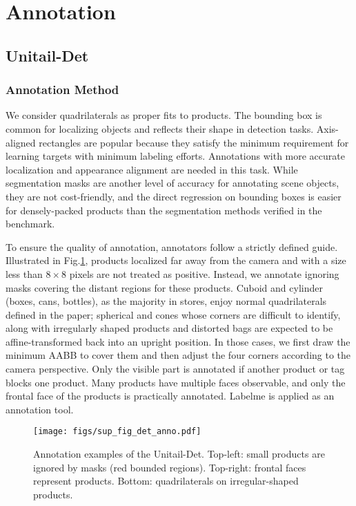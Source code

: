 \documentclass[runningheads]{llncs}
\begin{document}
\section{Annotation}
\subsection{Unitail-Det}
\subsubsection{Annotation Method}
We consider quadrilaterals as proper fits to products. The bounding box is common for localizing objects and reflects their shape in detection tasks. Axis-aligned rectangles are popular because they satisfy the minimum requirement for learning targets with minimum labeling efforts. Annotations with more accurate localization and appearance alignment are needed in this task. While segmentation masks are another level of accuracy for annotating scene objects, they are not cost-friendly, and the direct regression on bounding boxes is easier for densely-packed products than the segmentation methods verified in the benchmark. 

To ensure the quality of annotation, annotators follow a strictly defined guide. Illustrated in Fig.\ref{fig:det_anno_examples}, products localized far away from the camera and with a size less than $8 \times 8$ pixels are not treated as positive. Instead, we annotate ignoring masks covering the distant regions for these products. Cuboid and cylinder (boxes, cans, bottles), as the majority in stores, enjoy normal quadrilaterals defined in the paper; spherical and cones whose corners are difficult to identify, along with irregularly shaped products and distorted bags are expected to be affine-transformed back into an upright position. In those cases, we first draw the minimum AABB to cover them and then adjust the four corners according to the camera perspective. Only the visible part is annotated if another product or tag blocks one product. Many products have multiple faces observable, and only the frontal face of the products is practically annotated. Labelme \cite{wada2018labelme} is applied as an annotation tool.


\begin{figure}[t]
    \centering
    \texttt{[image: figs/sup\_fig\_det\_anno.pdf]}
    \caption{Annotation examples of the Unitail-Det. Top-left: small products are ignored by masks (red bounded regions). Top-right: frontal faces represent products. Bottom: quadrilaterals on irregular-shaped products.}
    \label{fig:det_anno_examples}
\end{figure}
\end{document}

